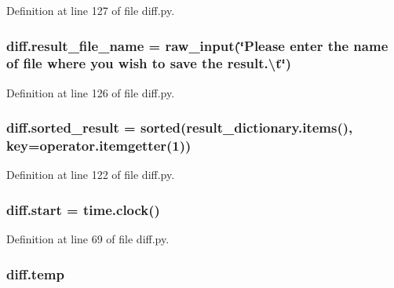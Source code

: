 Definition at line 127 of file diff.\+py.

\subsubsection[{\texorpdfstring{result\+\_\+file\+\_\+name}{result_file_name}}]{\setlength{\rightskip}{0pt plus 5cm}diff.\+result\+\_\+file\+\_\+name = raw\+\_\+input(\char`\"{}Please enter the name of {\bf file} where you wish to save the result.\textbackslash{}t\char`\"{})}\hypertarget{namespacediff_a15a863df81a6f3099b088f9f52808389}{}\label{namespacediff_a15a863df81a6f3099b088f9f52808389}


Definition at line 126 of file diff.\+py.

\subsubsection[{\texorpdfstring{sorted\+\_\+result}{sorted_result}}]{\setlength{\rightskip}{0pt plus 5cm}diff.\+sorted\+\_\+result = sorted(result\+\_\+dictionary.\+items(), key=operator.\+itemgetter(1))}\hypertarget{namespacediff_a3b4c2771da02846b61219801d8016b40}{}\label{namespacediff_a3b4c2771da02846b61219801d8016b40}


Definition at line 122 of file diff.\+py.

\subsubsection[{\texorpdfstring{start}{start}}]{\setlength{\rightskip}{0pt plus 5cm}diff.\+start = time.\+clock()}\hypertarget{namespacediff_ac1dbbabcf481dbdd8253f435c6841b59}{}\label{namespacediff_ac1dbbabcf481dbdd8253f435c6841b59}


Definition at line 69 of file diff.\+py.

\subsubsection[{\texorpdfstring{temp}{temp}}]{\setlength{\rightskip}{0pt plus 5cm}diff.\+temp}\hypertarget{namespacediff_a9b7319edd5fe67e6804984652b758844}{}\label{namespacediff_a9b7319edd5fe67e6804984652b758844}


